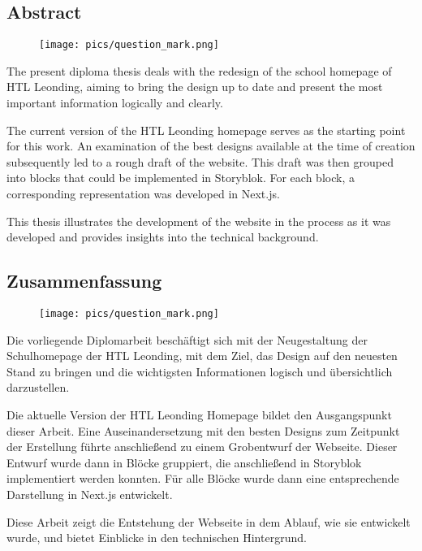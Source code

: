 \begin{spacing}{1}
    \chapter*{Abstract}
\end{spacing}
\begin{wrapfigure}{r}{0.3\textwidth}
    \begin{center}
      \texttt{[image: pics/question\_mark.png]}
    \end{center}
\end{wrapfigure}
The present diploma thesis deals with the redesign of the school homepage of HTL Leonding, aiming to bring the design up to date and present the most important information logically and clearly.

The current version of the HTL Leonding homepage serves as the starting point for this work. An examination of the best designs available at the time of creation subsequently led to a rough draft of the website. This draft was then grouped into blocks that could be implemented in Storyblok. For each block, a corresponding representation was developed in Next.js.

This thesis illustrates the development of the website in the process as it was developed and provides insights into the technical background.
\newpage
\begin{spacing}{1}
    \chapter*{Zusammenfassung}
\end{spacing}
\begin{wrapfigure}{r}{0.3\textwidth}
    \begin{center}
      \texttt{[image: pics/question\_mark.png]}
    \end{center}
\end{wrapfigure}
Die vorliegende Diplomarbeit beschäftigt sich mit der Neugestaltung der Schulhomepage der HTL Leonding, mit dem Ziel, das Design auf den neuesten Stand zu bringen und die wichtigsten Informationen logisch und übersichtlich darzustellen.

Die aktuelle Version der HTL Leonding Homepage bildet den Ausgangspunkt dieser Arbeit. Eine Auseinandersetzung mit den besten Designs zum Zeitpunkt der Erstellung führte anschließend zu einem Grobentwurf der Webseite. Dieser Entwurf wurde dann in Blöcke gruppiert, die anschließend in Storyblok implementiert werden konnten. Für alle Blöcke wurde dann eine entsprechende Darstellung in Next.js entwickelt.

Diese Arbeit zeigt die Entstehung der Webseite in dem Ablauf, wie sie entwickelt wurde, und bietet Einblicke in den technischen Hintergrund.
